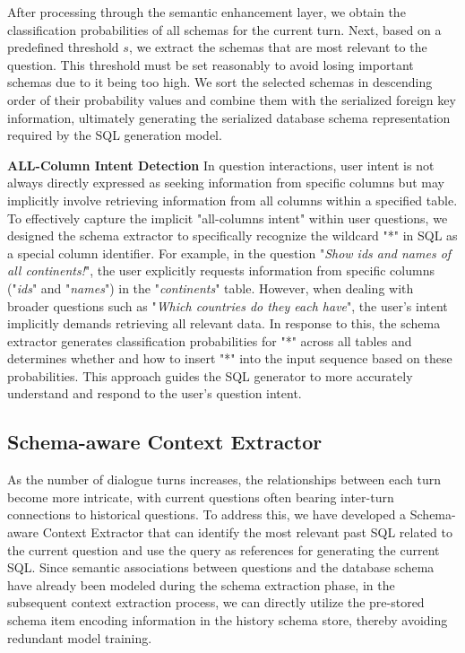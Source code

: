 \documentclass[11pt]{article}
\begin{document}
After processing through the semantic enhancement layer, we obtain the classification probabilities of all schemas for the current turn. Next, based on a predefined threshold $s$, we extract the schemas that are most relevant to the question. This threshold must be set reasonably to avoid losing important schemas due to it being too high. We sort the selected schemas in descending order of their probability values and combine them with the serialized foreign key information, ultimately generating the serialized database schema representation required by the SQL generation model. 

\vspace{4pt}
\noindent\textbf{ALL-Column Intent Detection} 
In question interactions, user intent is not always directly expressed as seeking information from specific columns but may implicitly involve retrieving information from all columns within a specified table. To effectively capture the implicit "all-columns intent" within user questions, we designed the schema extractor to specifically recognize the wildcard "*" in SQL as a special column identifier. For example, in the question "\textit{Show ids and names of all continents!}", the user explicitly requests information from specific columns ("\textit{ids}" and "\textit{names}") in the "\textit{continents}" table. However, when dealing with broader questions such as "\textit{Which countries do they each have}", the user's intent implicitly demands retrieving all relevant data. In response to this, the schema extractor generates classification probabilities for "*" across all tables and determines whether and how to insert "*" into the input sequence based on these probabilities. This approach guides the SQL generator to more accurately understand and respond to the user's question intent.

\subsection{Schema-aware Context Extractor}
\label{sec:History SQL Selection}
As the number of dialogue turns increases, the relationships between each turn become more intricate, with current questions often bearing inter-turn connections to historical questions. To address this, we have developed a Schema-aware Context Extractor that can identify the most relevant past SQL related to the current question and use the query as references for generating the current SQL. Since semantic associations between questions and the database schema have already been modeled during the schema extraction phase, in the subsequent context extraction process, we can directly utilize the pre-stored schema item encoding information in the history schema store, thereby avoiding redundant model training.
\end{document}
